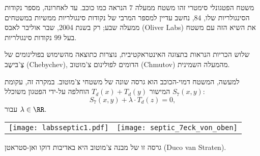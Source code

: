 \begin{surferPage}[%
משובע%
]{%
משטח הפטגונלי סימטרי%
}
    זהו משטח ממעלה $7$ הנראה כמו כוכב.
    עד לאחרונה, מספר נקודות הסינגולריות שלו, $84$, נחשב עדיין
    למספר המרבי של נקודות סינגולריות ממשיות במשטחים ממעלה שבע;
    רק בשנת 2004, שבר אוליבר לאבס
    \textenglish{(Oliver Labs)} את השיא הזה עם משטח בעל $99$ נקודות סינגולריות.

 שלוש הכריות הנראות בתצוגה האינטראקטיבית,
    נוצרות כתוצאה מהשימוש בפולינומים של צֶ'בּישֶב (Chebychev), הדומים לפולינום צ'מוטוב (Chmutov) מהמעלה השמינית.

    למעשה, המשטח דמוי-הכוכב הוא גרסה שונה של משטחי צ'מוטוב.
    במקרה זה, עקומת המישור $T_d(x)+T_d(y)$ הוחלפה על-ידי הפטגון משוכלל
    $S_7(x,y)$:
   \[S_7(x,y) + \lambda \cdot T_d(z) = 0,\]
    עבור $\lambda\in\RR$.
    \vspace*{-0.3em}
    \begin{center}
      \begin{tabular}{c@{\qquad}c}
        \texttt{[image: labsseptic1.pdf]}
        &
        \texttt{[image: septic\_7eck\_von\_oben]}
      \end{tabular}
    \end{center}
    \vspace*{-0.3em}
   גרסה זו של מבנה צ'מוטוב היא באדיבות דוקו ואן-סטראטן
   \textenglish{ (Duco van Straten)}.
\end{surferPage}
